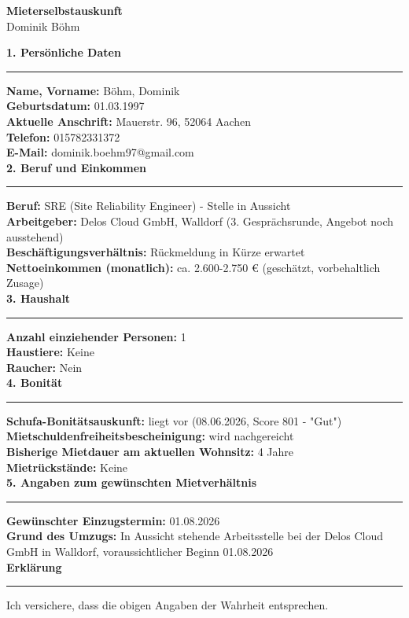\documentclass[11pt,a4paper]{article}
\newcommand{\formsection}[1]{{\large\bfseries\color{accent}#1}\par\vspace{2pt}\hrule\vspace{6pt}}
\newcommand{\field}[2]{\textbf{#1:} #2\\[2pt]}
\begin{document}
\begin{center}
{\Large\bfseries Mieterselbstauskunft}\\[2pt]
Dominik Böhm
\end{center}
\vspace{8pt}

\formsection{1. Persönliche Daten}
\field{Name, Vorname}{Böhm, Dominik}
\field{Geburtsdatum}{01.03.1997}
\field{Aktuelle Anschrift}{Mauerstr. 96, 52064 Aachen}
\field{Telefon}{015782331372}
\field{E-Mail}{dominik.boehm97@gmail.com}

\formsection{2. Beruf und Einkommen}
\field{Beruf}{SRE (Site Reliability Engineer) - Stelle in Aussicht}
\field{Arbeitgeber}{Delos Cloud GmbH, Walldorf (3. Gesprächsrunde, Angebot noch ausstehend)}
\field{Beschäftigungsverhältnis}{Rückmeldung in Kürze erwartet}
\field{Nettoeinkommen (monatlich)}{ca. 2.600-2.750 € (geschätzt, vorbehaltlich Zusage)}

\formsection{3. Haushalt}
\field{Anzahl einziehender Personen}{1}
\field{Haustiere}{Keine}
\field{Raucher}{Nein}

\formsection{4. Bonität}
\field{Schufa-Bonitätsauskunft}{liegt vor (08.06.2026, Score 801 - "Gut")}
\field{Mietschuldenfreiheitsbescheinigung}{wird nachgereicht}
\field{Bisherige Mietdauer am aktuellen Wohnsitz}{4 Jahre}
\field{Mietrückstände}{Keine}

\formsection{5. Angaben zum gewünschten Mietverhältnis}
\field{Gewünschter Einzugstermin}{01.08.2026}
\field{Grund des Umzugs}{In Aussicht stehende Arbeitsstelle bei der Delos Cloud GmbH in Walldorf, voraussichtlicher Beginn 01.08.2026}

\vspace{14pt}
\formsection{Erklärung}
Ich versichere, dass die obigen Angaben der Wahrheit entsprechen.
\vspace{24pt}

\noindent
\makebox[6cm]{\hrulefill} \hfill \makebox[6cm]{\hrulefill}\\
 \hfill {}
\end{document}

